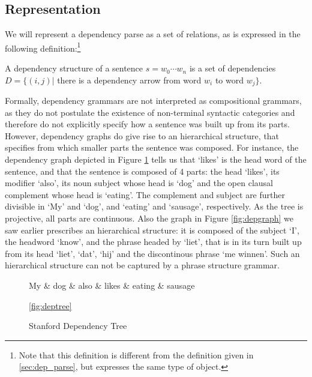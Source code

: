 \documentclass{report}
\begin{document}
\subsection{Representation}

We will represent a dependency parse as a set of relations, as is expressed in the following definition:\footnote{Note that this definition is different from the definition given in \ref{sec:dep_parse}, but expresses the same type of object.}

\begin{definition}
A dependency structure of a sentence $s = w_0\cdots w_n$ is a set of dependencies $D = \{ (i,j) |$ there is a dependency arrow from word $w_i$ to word $w_j \}$. 
\end{definition}

Formally, dependency grammars are not interpreted as compositional grammars, as they do not postulate the existence of non-terminal syntactic categories and therefore do not explicitly specify how a sentence was built up from its parts. However, dependency graphs do give rise to an hierarchical structure, that specifies from which smaller parts the sentence was composed. For instance, the dependency graph depicted in Figure \ref{fig:deptree1} tells us that `likes' is the head word of the sentence, and that the sentence is composed of 4 parts: the head `likes', its modifier `also', its noun subject whose head is `dog' and the open clausal complement whose head is `eating'. The complement and subject are further divisible in `My' and `dog', and `eating' and `sausage', respectively. As the tree is projective, all parts are continuous. Also the graph in Figure \ref{fig:depgraph} we saw earlier prescribes an hierarchical structure: it is composed of the subject `I', the headword `know', and the phrase headed by `liet', that is in its turn built up from its head `liet', `dat', `hij' and the discontinous phrase `me winnen'. Such an hierarchical structure can not be captured by a phrase structure grammar.

\begin{figure}[!h]\label{fig:deptree1}
\centering
\begin{dependency}[theme=simple]%
\begin{deptext}[column sep=.5cm, row sep=.1ex]
My \& dog \& also \& likes \& eating \& sausage \\
\end{deptext}
\end{dependency}
\caption{Stanford Dependency Tree}\ref{fig:deptree}
\end{figure}
\end{document}
